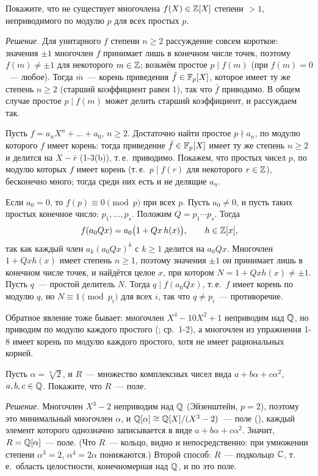 \begin{exercise}[1-6]
Покажите, что не существует многочлена $f(X)\in\mathbb Z[X]$ степени $>1$, неприводимого по модулю $p$ для всех простых $p$.
\end{exercise}

\noindent\emph{Решение.} Для унитарного $f$ степени $n\ge2$ рассуждение совсем короткое: значения $\pm1$ многочлен $f$
принимает лишь в конечном числе точек, поэтому $f(m)\ne\pm1$ для некоторого $m\in\mathbb Z$; возьмём простое $p\mid f(m)$ (при
$f(m)=0$~--- любое). Тогда $\bar m$~--- корень приведения $\bar f\in\mathbb F_p[X]$, которое имеет ту же степень $n\ge2$ (старший
коэффициент равен $1$), так что $\bar f$ приводимо. В общем случае простое $p\mid f(m)$ может делить старший коэффициент,
и рассуждаем так.

Пусть $f=a_nX^n+\dots+a_0$, $n\ge2$. Достаточно найти простое $p\nmid a_n$, по модулю которого $f$
имеет корень: тогда приведение $\bar f\in\mathbb F_p[X]$ имеет ту же степень $n\ge2$ и делится на $X-\bar r$ (1-3(b)), т.\,е.\
приводимо. Покажем, что простых чисел $p$, по модулю которых $f$ имеет корень (т.\,е.\ $p\mid f(r)$ для некоторого
$r\in\mathbb Z$), бесконечно много; тогда среди них есть и не делящие $a_n$.

Если $a_0=0$, то $f(p)\equiv0\pmod p$ при всех $p$. Пусть $a_0\ne0$, и пусть таких простых конечное число: $p_1,\dots,p_s$.
Положим $Q=p_1\cdots p_s$. Тогда
\[
f(a_0Qx)=a_0\bigl(1+Qx\,h(x)\bigr),\qquad h\in\mathbb Z[x],
\]
так как каждый член $a_k(a_0Qx)^k$ с $k\ge1$ делится на $a_0Qx$. Многочлен $1+Qxh(x)$ имеет степень $n\ge1$, поэтому
значения $\pm1$ он принимает лишь в конечном числе точек, и найдётся целое $x$, при котором $N=1+Qxh(x)\ne\pm1$. Пусть
$q$~--- простой делитель $N$. Тогда $q\mid f(a_0Qx)$, т.\,е.\ $f$ имеет корень по модулю $q$, но $N\equiv1\pmod{p_i}$ для всех
$i$, так что $q\ne p_i$~--- противоречие.

Обратное явление тоже бывает: многочлен $X^4-10X^2+1$ неприводим над $\mathbb Q$, но приводим по модулю каждого простого (;
ср.\ 1-2), а многочлен из упражнения 1-8 имеет корень по модулю каждого простого, хотя не имеет рациональных корней.

\begin{exercise}[1-7]
Пусть $\alpha=\sqrt[3]2$, и $R$~--- множество комплексных чисел вида $a+b\alpha+c\alpha^2$, $a,b,c\in\mathbb Q$. Покажите, что $R$~---
поле.
\end{exercise}

\noindent\emph{Решение.} Многочлен $X^3-2$ неприводим над $\mathbb Q$ (Эйзенштейн, $p=2$), поэтому это минимальный многочлен
$\alpha$, и $\mathbb Q[\alpha]\cong\mathbb Q[X]/(X^3-2)$~--- поле (\rf{1.25}), каждый элемент которого однозначно записывается в виде
$a+b\alpha+c\alpha^2$. Значит, $R=\mathbb Q[\alpha]$~--- поле. (Что $R$~--- кольцо, видно и непосредственно: при умножении
степени $\alpha^3=2$, $\alpha^4=2\alpha$ понижаются.) Второй способ: $R$~--- подкольцо $\mathbb C$, т.\,е.\ область
целостности, конечномерная над $\mathbb Q$, и по \rf{1.23} это поле.

